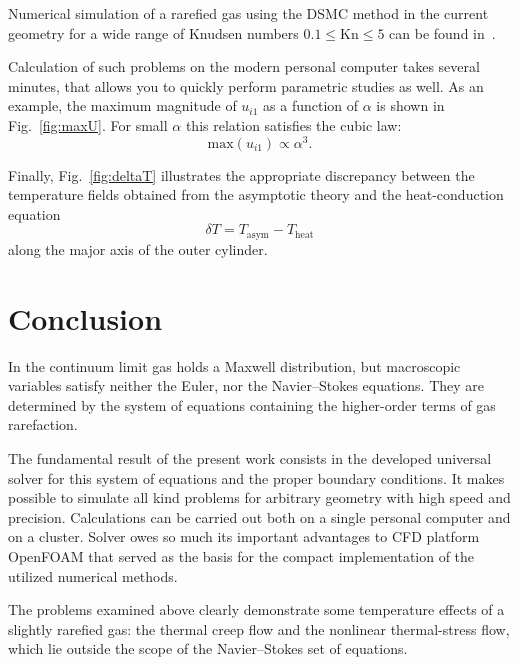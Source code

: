 \documentclass[english,a4paper,10pt]{article}
\newcommand{\Kn}{\mathrm{Kn}}
\begin{document}
Numerical simulation of a rarefied gas using the DSMC method in the current geometry
for a wide range of Knudsen numbers \(0.1\le\Kn\le5\) can be found in~\cite{Sone1998}.

Calculation of such problems on the modern personal computer takes several minutes,
that allows you to quickly perform parametric studies as well. As an example,
the maximum magnitude of \(u_{i1}\) as a function of \(\alpha\) is shown in Fig.~\ref{fig:maxU}.
For small \(\alpha\) this relation satisfies the cubic law:
\begin{equation}
	\mathrm{max}(u_{i1}) \propto \alpha^3.
\end{equation}

Finally, Fig.~\ref{fig:deltaT} illustrates the appropriate discrepancy between the temperature fields
obtained from the asymptotic theory and the heat-conduction equation
\[ \delta T = T_\mathrm{asym} - T_\mathrm{heat} \]
along the major axis of the outer cylinder.

\section{Conclusion}

In the continuum limit gas holds a Maxwell distribution, but
macroscopic variables satisfy neither the Euler,
nor the Navier--Stokes equations. They are determined by the system of equations
containing the higher-order terms of gas rarefaction.

The fundamental result of the present work consists in the developed universal solver
for this system of equations and the proper boundary conditions.
It makes possible to simulate all kind problems for arbitrary geometry with high speed and precision.
Calculations can be carried out both on a single personal computer and on a cluster.
Solver owes so much its important advantages to CFD platform OpenFOAM\textregistered{}
that served as the basis for the compact implementation of the utilized numerical methods.

The problems examined above clearly demonstrate some temperature effects of
a slightly rarefied gas: the thermal creep flow and the nonlinear thermal-stress flow,
which lie outside the scope of the Navier--Stokes set of equations.

\printbibliography
\end{document}

